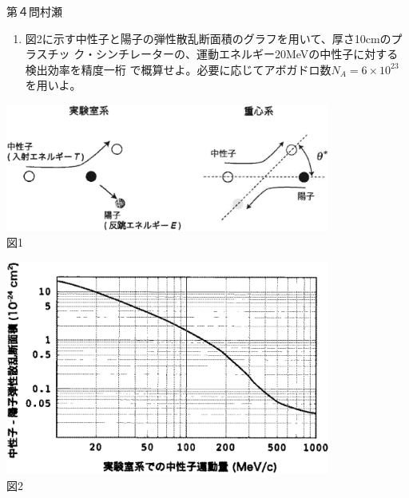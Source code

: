 \begin{question}{第４問}{村瀬}
\begin{enumerate}
\item
  図2に示す中性子と陽子の弾性散乱断面積のグラフを用いて、厚さ10cmのプラスチッ
  ク・シンチレーターの、運動エネルギー20MeVの中性子に対する検出効率を精度一桁
  で概算せよ。必要に応じてアボガドロ数$N_A=6\times10^{23}$を用いよ。
\end{enumerate}
\begin{center}
  \includegraphics[width=0.8\textwidth]{2006physQ4_1r.eps}\\図1
\end{center}
\begin{center}
  \includegraphics[width=0.8\textwidth]{2006physQ4_2r.eps}\\図2
\end{center}
\end{question}

